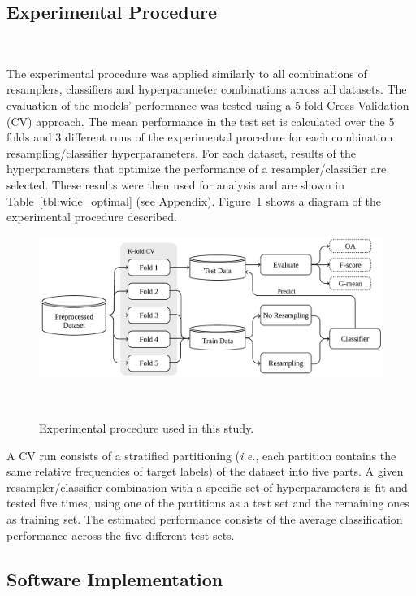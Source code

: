 \documentclass[parskip=full]{scrartcl}
\begin{document}
\subsection{Experimental Procedure}~\label{sec:experimental_procedure}

The experimental procedure was applied similarly to all combinations of
resamplers, classifiers and hyperparameter combinations across all datasets.
The evaluation of the models' performance was tested using a 5-fold Cross
Validation (CV) approach. The mean performance in the test set is calculated
over the 5 folds and 3 different runs of the experimental procedure for each
combination resampling/classifier hyperparameters. For each dataset, results
of the hyperparameters that optimize the performance of a resampler/classifier
are selected. These results were then used for analysis and are shown in
Table~\ref{tbl:wide_optimal} (see Appendix).
Figure~\ref{fig:experimental_procedure} shows a diagram of the experimental
procedure described.

\begin{figure}
	\centering
	\includegraphics[width=.8\linewidth]{../analysis/experimental_procedure}
    \caption{Experimental procedure used in this study.
    }~\label{fig:experimental_procedure}
\end{figure}

A CV run consists of a stratified partitioning (\textit{i.e.}, each partition
contains the same relative frequencies of target labels) of the dataset into
five parts. A given resampler/classifier combination with a specific set of
hyperparameters is fit and tested five times, using one of the partitions as a
test set and the remaining ones as training set. The estimated performance
consists of the average classification performance across the five different
test sets. 

\subsection{Software Implementation}~\label{sec:software_implementation}
\end{document}
